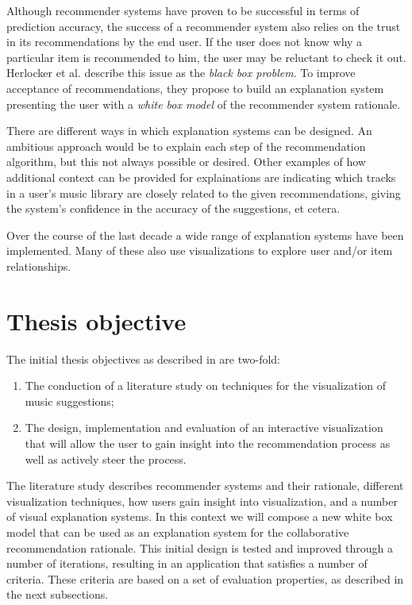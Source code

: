 Although recommender systems have proven to be successful in terms of prediction accuracy, the success of a recommender system also relies on the trust in its recommendations by the end user. If the user does not know why a particular item is recommended to him, the user may be reluctant to check it out. Herlocker et al. \cite{herlocker:2000} describe this issue as the \emph{black box problem}. To improve acceptance of recommendations, they propose to build an explanation system presenting the user with a \emph{white box model} of the recommender system rationale.

There are different ways in which explanation systems can be designed. An ambitious approach would be to explain each step of the recommendation algorithm, but this not always possible or desired. Other examples of how additional context can be provided for explainations are indicating which tracks in a user's music library are closely related to the given recommendations, giving the system's confidence in the accuracy of the suggestions, et cetera\cite{herlocker:2000}.

Over the course of the last decade a wide range of explanation systems have been implemented. Many of these also use visualizations to explore user and/or item relationships\cite{bostandjiev:2012, gou:2011:SIF:2016656.2016671, gretarsson:2010, odonovan:2008, zhao:2010}.


\section{Thesis objective}\label{chapter:introduction:section:objective}

The initial thesis objectives as described in \cite{kuleuven:2008:t313} are two-fold:

\begin{enumerate}
	\item The conduction of a literature study on techniques for the visualization of music suggestions;
	\item The design, implementation and evaluation of an interactive visualization that will allow the user to gain insight into the recommendation process as well as actively steer the process.
\end{enumerate}

The literature study describes recommender systems and their rationale, different visualization techniques, how users gain insight into visualization, and a number of visual explanation systems. In this context we will compose a new white box model that can be used as an explanation system for the collaborative recommendation rationale. This initial design is tested and improved through a number of iterations, resulting in an application that satisfies a number of criteria. These criteria are based on a set of evaluation properties, as described in the next subsections.

